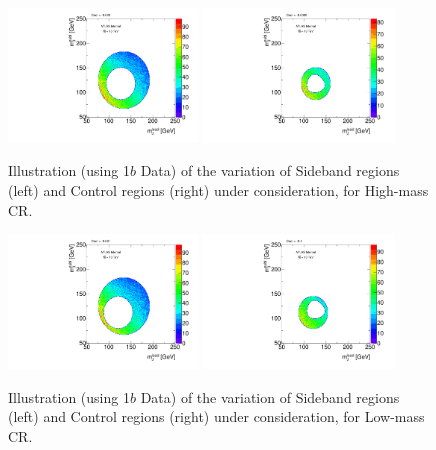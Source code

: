 \begin{figure}[htbp!]
\begin{center}
\includegraphics[width=0.45\textwidth,angle=-90]{figures/boosted/Syst_CRSB/CR_High_Sideband_OneTag_mH0H1.pdf}
\includegraphics[width=0.45\textwidth,angle=-90]{figures/boosted/Syst_CRSB/CR_High_Control_OneTag_mH0H1.pdf}\\
\end{center}
\caption{Illustration (using 1$b$ Data) of the variation of Sideband regions (left) and Control regions (right) under consideration, for High-mass CR.}
\label{CRSB:CR_High}
\end{figure}

\begin{figure}[htbp!]
\begin{center}
\includegraphics[width=0.45\textwidth,angle=-90]{figures/boosted/Syst_CRSB/CR_Low_Sideband_OneTag_mH0H1.pdf}
\includegraphics[width=0.45\textwidth,angle=-90]{figures/boosted/Syst_CRSB/CR_Low_Control_OneTag_mH0H1.pdf}\\
\end{center}
\caption{Illustration (using 1$b$ Data) of the variation of Sideband regions (left) and Control regions (right) under consideration, for Low-mass CR.}
\label{CRSB:CR_Low}
\end{figure}

